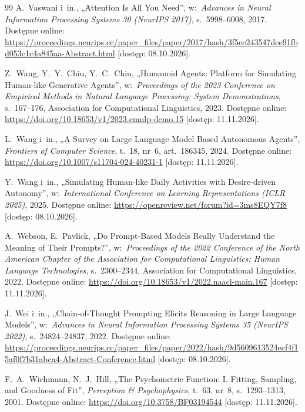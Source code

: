 \begin{thebibliography}{99}
 A.~Vaswani i~in., „Attention Is All You Need”, w:~\textit{Advances in Neural Information Processing Systems 30 (NeurIPS 2017)}, s.~5998--6008, 2017. Dostępne online: \url{https://proceedings.neurips.cc/paper_files/paper/2017/hash/3f5ee243547dee91fbd053c1c4a845aa-Abstract.html} [dostęp: 08.10.2026].

 Z.~Wang, Y.~Y.~Chiu, Y.~C.~Chiu, „Humanoid Agents: Platform for Simulating Human-like Generative Agents”, w:~\textit{Proceedings of the 2023 Conference on Empirical Methods in Natural Language Processing: System Demonstrations}, s.~167--176, Association for Computational Linguistics, 2023. Dostępne online: \url{https://doi.org/10.18653/v1/2023.emnlp-demo.15} [dostęp: 11.11.2026].

 L.~Wang i~in., „A Survey on Large Language Model Based Autonomous Agents”, \textit{Frontiers of Computer Science}, t.~18, nr~6, art.~186345, 2024. Dostępne online: \url{https://doi.org/10.1007/s11704-024-40231-1} [dostęp: 11.11.2026].

 Y.~Wang i~in., „Simulating Human-like Daily Activities with Desire-driven Autonomy”, w:~\textit{International Conference on Learning Representations (ICLR 2025)}, 2025. Dostępne online: \url{https://openreview.net/forum?id=3ms8EQY7f8} [dostęp: 08.10.2026].

 A.~Webson, E.~Pavlick, „Do Prompt-Based Models Really Understand the Meaning of Their Prompts?”, w:~\textit{Proceedings of the 2022 Conference of the North American Chapter of the Association for Computational Linguistics: Human Language Technologies}, s.~2300--2344, Association for Computational Linguistics, 2022. Dostępne online: \url{https://doi.org/10.18653/v1/2022.naacl-main.167} [dostęp: 11.11.2026].

 J.~Wei i~in., „Chain-of-Thought Prompting Elicits Reasoning in Large Language Models”, w:~\textit{Advances in Neural Information Processing Systems 35 (NeurIPS 2022)}, s.~24824--24837, 2022. Dostępne online: \url{https://proceedings.neurips.cc/paper_files/paper/2022/hash/9d5609613524ecf4f15af0f7b31abca4-Abstract-Conference.html} [dostęp: 08.10.2026].

 F.~A.~Wichmann, N.~J.~Hill, „The Psychometric Function: {I}. {Fitting}, Sampling, and Goodness of Fit”, \textit{Perception \& Psychophysics}, t.~63, nr~8, s.~1293--1313, 2001. Dostępne online: \url{https://doi.org/10.3758/BF03194544} [dostęp: 11.11.2026].


\end{thebibliography}
